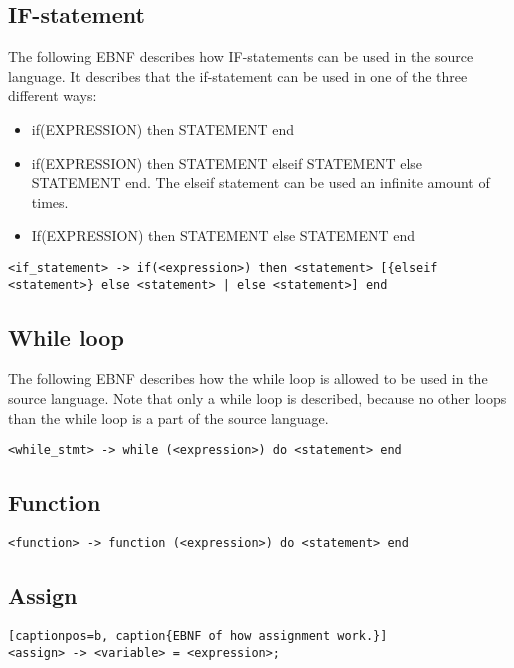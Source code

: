\subsection{IF-statement}
The following EBNF describes how IF-statements can be used in the source language. It describes that the if-statement can be used in one of the three different ways:
\begin{itemize}
	\item if(EXPRESSION) then STATEMENT end
	\item if(EXPRESSION) then STATEMENT elseif STATEMENT else STATEMENT end. The elseif statement can be used an infinite amount of times.
	\item If(EXPRESSION) then STATEMENT else STATEMENT end
\end{itemize}
\begin{lstlisting}[captionpos=b, caption={EBNF of the IF-statement in the source language}]
<if_statement> -> if(<expression>) then <statement> [{elseif <statement>} else <statement> | else <statement>] end
\end{lstlisting}


\subsection{While loop}
The following EBNF describes how the while loop is allowed to be used in the source language. Note that only a while loop is described, because no other loops than the while loop is a part of the source language.
\begin{lstlisting}[captionpos=b, caption={EBNF of a while loop.}]
<while_stmt> -> while (<expression>) do <statement> end
\end{lstlisting}

\subsection{Function}
\begin{lstlisting}[captionpos=b, caption={EBNF of a function.}]
<function> -> function (<expression>) do <statement> end
\end{lstlisting}

\subsection{Assign}
\begin{lstlisting}[captionpos=b, caption{EBNF of how assignment work.}]
<assign> -> <variable> = <expression>;
\end{lstlisting}

